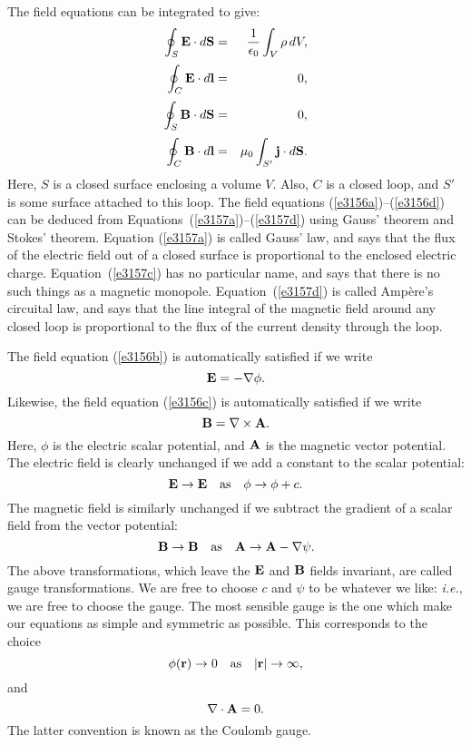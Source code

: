 The field equations can be integrated to give:
\begin{eqnarray}
\oint_S {\bf E} \cdot d{\bf S} &=& \frac{1}{\epsilon_0}\int_V \rho\,dV,\label{e3157a}\\[0.5ex]
\oint_C {\bf E} \cdot d{\bf l} &=& 0,\label{e3157b}\\[0.5ex]
\oint_S {\bf B} \cdot d{\bf S} &=& 0,\label{e3157c}\\[0.5ex]
\oint_C {\bf B} \cdot d{\bf l} &=& \mu_0 \int_{S'} {\bf j} \cdot d{\bf S}.\label{e3157d}
\end{eqnarray}
Here, $S$ is a closed surface enclosing a volume $V$. Also, $C$ is a closed loop,
and $S'$ is some surface attached to this loop. The field equations 
(\ref{e3156a})--(\ref{e3156d}) can be deduced
from Equations~(\ref{e3157a})--(\ref{e3157d}) using Gauss' theorem and Stokes' theorem. Equation
(\ref{e3157a}) is called Gauss' law, and says that the flux of the electric field
out of a closed surface is proportional to the enclosed electric charge. 
Equation~(\ref{e3157c}) has no particular name, and says that there is no such
things as a magnetic monopole. Equation~(\ref{e3157d}) is called Amp\`{e}re's circuital  law,
and says that the line integral of the magnetic
field around any closed loop is proportional
to the flux of the current density through the loop. 

The field equation (\ref{e3156b}) is automatically satisfied if we write
\begin{equation}
{\bf E} = -\nabla \phi.\label{e3158}
\end{equation}
Likewise, the field equation (\ref{e3156c}) is automatically satisfied if we write
\begin{equation}
{\bf B} = \nabla\times{\bf A}.\label{e3159}
\end{equation}
Here, $\phi$ is the electric scalar potential, and ${\bf A}$ is the magnetic vector
potential. The electric field is clearly unchanged if we add a constant to the
scalar potential:
\begin{equation}
{\bf E} \rightarrow {\bf E}~~~{\rm as}~~~\phi\rightarrow \phi + c.
\end{equation}
The magnetic field is similarly unchanged if we subtract  the gradient of a scalar field from
the vector potential:
\begin{equation}
{\bf B} \rightarrow {\bf B}~~~{\rm as}~~~{\bf A} \rightarrow {\bf A} - \nabla\psi.
\end{equation}
The above transformations, which leave the ${\bf E}$ and ${\bf B}$ fields
invariant, are called gauge transformations. We are free to choose $c$ and $\psi$
to be whatever we like: {\em i.e.}, we are free to choose the gauge.
The most sensible gauge is the one  which make our
equations as simple and symmetric as possible. This corresponds to the choice
\begin{equation}
\phi({\bf r}) \rightarrow 0~~~{\rm as}~~~|{\bf r}| \rightarrow \infty,
\end{equation}
and 
\begin{equation}
\nabla\cdot {\bf A} = 0.
\end{equation}
The latter convention is known as the Coulomb gauge.


